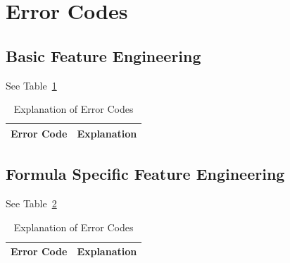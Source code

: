 \documentclass[letterpaper,12pt]{article}
\begin{document}
\section{Error Codes}

\subsection{Basic Feature Engineering}
See Table~\ref{explanation_plp1_errs}
\begin{table}
  \centering
  \begin{tabular}{|l|l|} \hline \hline
    {\bf Error Code} & {\bf Explanation} \\ \hline  \hline
    
    \hline
  \end{tabular}
  \label{explanation_plp1_errs}
  \caption{Explanation of Error Codes}
\end{table}

\subsection{Formula Specific Feature Engineering}

See Table~\ref{explanation_plp2_errs}
\begin{table}
  \centering
  \begin{tabular}{|l|l|} \hline \hline
    {\bf Error Code} & {\bf Explanation} \\ \hline  \hline
    
    \hline
  \end{tabular}
  \label{explanation_plp2_errs}
  \caption{Explanation of Error Codes}
\end{table}
\end{document}
